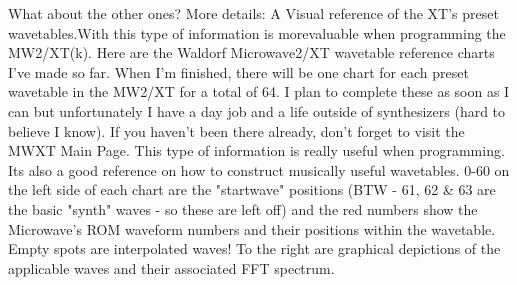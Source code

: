 What about the other ones?
More details: A Visual reference of the XT's preset wavetables.With this type of information is morevaluable when programming the MW2/XT(k). 
Here are the Waldorf Microwave2/XT wavetable reference charts I've made so far. When I'm finished, there will be one chart for each preset wavetable in the MW2/XT for a total of 64. I plan to complete these as soon as I can but unfortunately I have a day job and a life outside of synthesizers (hard to believe I know).
If you haven't been there already, don't forget to visit the MWXT Main Page.
This type of information is really useful when programming. Its also a good reference on how to construct musically useful wavetables. 0-60 on the left side of each chart are the "startwave" positions (BTW - 61, 62 \& 63 are the basic "synth" waves - so these are left off) and the red numbers show the Microwave's ROM waveform numbers and their positions within the wavetable. Empty spots are interpolated waves! To the right are graphical depictions of the applicable waves and their associated FFT spectrum.

